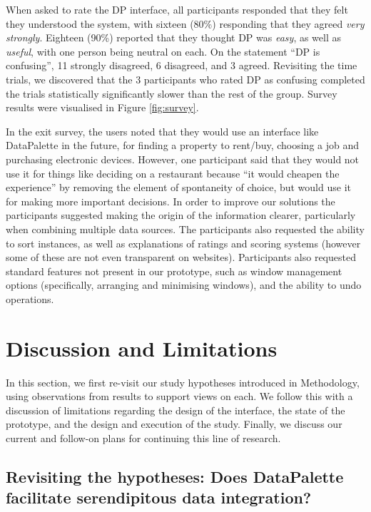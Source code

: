 \documentclass{sigchi}
\begin{document}
When asked to rate the DP interface, all participants responded that they felt they understood the system, with sixteen (80\%) responding that they agreed \emph{very strongly}.  Eighteen (90\%) reported that they thought  DP was \emph{easy}, as well as \emph{useful}, with one person being neutral on each.  On the statement ``DP is confusing'',  11 strongly disagreed, 6 disagreed, and 3 agreed.  Revisiting the time trials, we discovered that the 3 participants who rated DP as confusing completed the trials statistically significantly slower than the rest of the group. Survey results were visualised in Figure \ref{fig:survey}.


In the exit survey, the users noted that they would use an interface like DataPalette in the future, for finding a property to rent/buy, choosing a job and purchasing electronic devices.  However, one participant said that they would not use it for things like deciding on a restaurant because ``it would cheapen the experience'' by removing the element of spontaneity of choice, but would use it for making more important decisions.  In order to improve our solutions the participants suggested making the origin of the information clearer, particularly when combining multiple data sources. The participants also requested the ability to sort instances, as well as explanations of ratings and scoring systems (however some of these are not even transparent on websites). Participants also requested standard features not present in our prototype, such as window management options (specifically, arranging and minimising windows), and the ability to undo operations.

\section{Discussion and Limitations}

In this section, we first re-visit our study hypotheses introduced in Methodology, using observations from results to support views on each.  We follow this with a discussion of limitations regarding the design of the interface, the state of the prototype, and the design and execution of the study.  Finally, we discuss our current and follow-on plans for continuing this line of research.

\subsection{Revisiting the hypotheses: Does DataPalette facilitate serendipitous data integration?}
\end{document}
